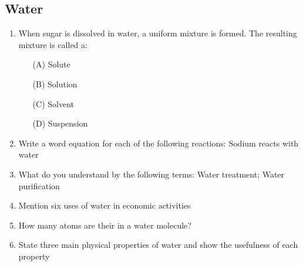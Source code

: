 \subsection{Water}

\begin{enumerate}
	\item When sugar is dissolved in water, a uniform mixture is formed. The resulting mixture is called a:
		\begin{enumerate}[topsep=0ex,itemsep=0ex,partopsep=1ex,parsep=1ex]
		\item[(A)] Solute
		\item[(B)] Solution
		\item[(C)] Solvent
		\item[(D)] Suspension
	\end{enumerate}

	\item Write a word equation for each of the following reactions: Sodium reacts with water
	
	\item What do you understand by the following terms: Water treatment; Water purification
	
	\item Mention six uses of water in economic activities
	
	\item How many atoms are their in a water molecule?

	\item State three main physical properties of water and show the usefulness of each property

\end{enumerate}















